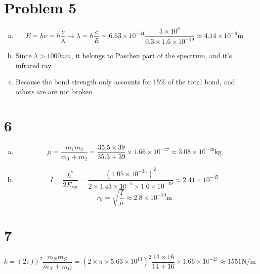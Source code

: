 \documentclass[a4paper]{article}
\begin{document}
\section{Problem 5}
\begin{enumerate}[(a)]
    \item $$E=h\nu=h\frac{c}{\lambda}\rightarrow\lambda=h\frac{c}{E}=6.63\times10^{-34}\frac{3\times10^8}{0.3\times1.6\times10^{-19}}\approx4.14\times10^{-6}\text{m}$$
    \item Since $\lambda>1000nm$, it belongs to Paschen part of the spectrum, and it's infrared ray
    \item Because the bond strength only accounts for 15\% of the total bond, and others are are not broken
\end{enumerate}
\section{6}
\begin{enumerate}[(a)]
    \item $$\mu=\frac{m_1m_2}{m_1+m_2}=\frac{35.5\times39}{35.3+39}\times1.66\times10^{-27}\approx3.08\times10^{-26}\text{kg}$$
    \item $$I=\frac{\hbar^2}{2E_{rot}}=\frac{(1.05\times10^{-34})^2}{2\times1.43\times10^{-5}\times1.6\times10^{-19}}\approx2.41\times10^{-45}$$
    $$r_0=\sqrt{\frac{I}{\mu}}\approx2.8\times10^{-10}\text{m}$$
\end{enumerate}
\section{7}
$$k=(2\pi f)^2\frac{m_Nm_O}{m_N+m_O}=(2\times\pi\times5.63\times10^{13})^2\frac{14\times16}{14+16}\times1.66\times10^{-27}\approx1551\text{N/m}$$
\end{document}
